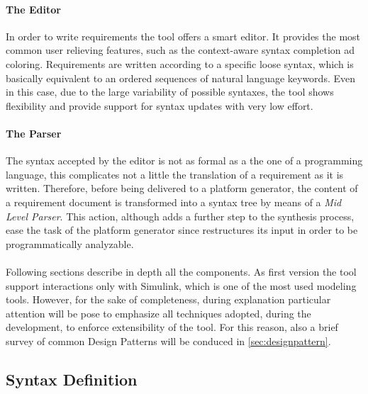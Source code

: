 \paragraph{The Editor} In order to write requirements the tool offers a smart editor. It provides the most common user relieving features, such as the context-aware syntax completion ad coloring. Requirements are written according to a specific loose syntax, which is basically equivalent to an ordered sequences of natural language keywords. Even in this case, due to the large variability of possible syntaxes, the tool shows flexibility and provide support for syntax updates with very low effort.
\paragraph{The Parser} The syntax accepted by the editor is not as formal as a the one of a programming language, this complicates not a little the translation of a requirement as it is written. Therefore, before being delivered to a platform generator, the content of a requirement document is transformed into a syntax tree by means of a \textit{Mid Level Parser}. This action, although adds a further step to the synthesis process, ease the task of the platform generator since restructures its input in order to be programmatically analyzable.
\paragraph{} Following sections describe in depth all the components. As first version the tool support interactions only with Simulink, which is one of the most used modeling tools. However, for the sake of completeness, during explanation particular attention will be pose to emphasize all techniques adopted, during the development, to enforce extensibility of the tool. For this reason, also a brief survey of common Design Patterns will be conduced in \ref{sec:designpattern}.

\subsection{Syntax Definition}
\label{ssec:editorsyn}

